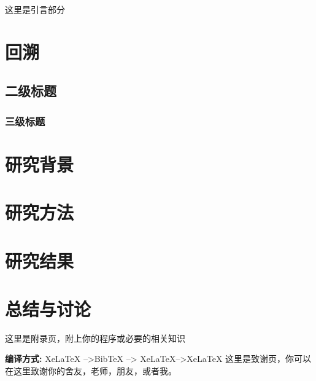 \documentclass{LZUthesis}
\begin{document}
\tableofcontents
\renewcommand\listfigurename{插\ 图\ 目\ 录}
\renewcommand\listtablename{表\ 格\ 目\ 录}
\listoffigures
\listoftables
\mainmatter

\Intro
这里是引言部分

\chapter{回溯}

\section{二级标题}
\subsection{三级标题}

\chapter{研究背景}

\chapter{研究方法}

\chapter{研究结果}

\chapter{总结与讨论}

\backmatter


\printbib




\Appendix


这里是附录页，附上你的程序或必要的相关知识\cite{partl2016}

{\bfseries 编译方式:} XeLaTeX -->BibTeX --> XeLaTeX-->XeLaTeX
\Thanks
这里是致谢页，你可以在这里致谢你的舍友，老师，朋友，或者我。
\end{document}

